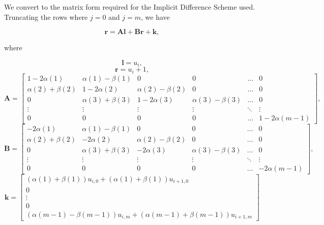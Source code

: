 \documentclass{article}
\begin{document}
We convert to the matrix form required for the Implicit Difference Scheme used. Truncating the rows where \(j=0\) and \(j=m\), we have

\begin{equation}
  \textbf{r} = \textbf{Al} + \textbf{Br} + \textbf{k},
\end{equation}

where

\begin{equation}
  \textbf{l} = u_{i},
\end{equation}
\begin{equation}
  \textbf{r} = u_i+1,
\end{equation}
\begin{equation}
  \textbf{A} = \begin{bmatrix}
    1-2\alpha(1) & \alpha(1) - \beta(1) & 0 & 0 & \hdots & 0 \\
    \alpha(2) + \beta(2) & 1-2\alpha(2) & \alpha(2) - \beta(2) & 0 & \hdots & 0 \\
    0 & \alpha(3) + \beta(3) & 1-2\alpha(3) & \alpha(3) - \beta(3) & \hdots & 0 \\
    \vdots & \vdots & \vdots & \vdots & \ddots & \vdots \\
    0 & 0 & 0 & 0 & \hdots & 1-2\alpha(m-1)
  \end{bmatrix},
\end{equation}
\begin{equation}
  \textbf{B} = \begin{bmatrix}
    -2\alpha(1) & \alpha(1) - \beta(1) & 0 & 0 & \hdots & 0 \\
    \alpha(2) + \beta(2) & -2\alpha(2) & \alpha(2) - \beta(2) & 0 & \hdots & 0 \\
    0 & \alpha(3) + \beta(3) & -2\alpha(3) & \alpha(3) - \beta(3) & \hdots & 0 \\
    \vdots & \vdots & \vdots & \vdots & \ddots & \vdots \\
    0 & 0 & 0 & 0 & \hdots & -2\alpha(m-1)
  \end{bmatrix},
\end{equation}
\begin{equation}
  \textbf{k} = \begin{bmatrix}
    (\alpha(1) + \beta(1))u_{i, 0} + (\alpha(1) + \beta(1))u_{i+1, 0} \\
    0 \\
    \vdots \\
    0 \\
    (\alpha(m-1) - \beta(m-1))u_{i, m} + (\alpha(m-1) + \beta(m-1))u_{i+1, m}
  \end{bmatrix}
\end{equation}
\end{document}

